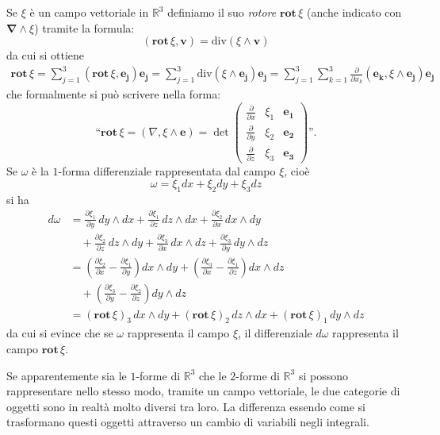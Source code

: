 \documentclass[italian,a4paper]{scrartcl}
\newcommand{\RR}{{\mathbb R}}
\newcommand{\defeq}{=}
\renewcommand{\vec}{\mathbf}
\renewcommand{\div}{\mathrm{div}}
\newcommand{\rot}{\mathbf{rot}\,}
\newcommand{\vecnabla}{\mathbf{\nabla}}
\begin{document}
Se $\xi$ è un campo vettoriale in $\RR^3$ definiamo
il suo \emph{rotore} $\rot \xi$ (anche indicato con $\vecnabla \wedge
\xi$)
tramite la formula:
\[
  (\rot \xi, \vec v) \defeq \div (\xi \wedge \vec v)
\]
da cui si ottiene
\begin{align*}
  \rot \xi = \sum_{j=1}^3 (\rot \xi,\vec{e_j})\vec{e_j}
 = \sum_{j=1}^3 \div(\xi \wedge \vec{e_j}) \vec{e_j}
 = \sum_{j=1}^3 \sum_{k=1}^3 \frac{\partial}{\partial x_k}(\vec {e_k},\xi\wedge
 \vec {e_j}) \vec{e_j}
\end{align*}
che formalmente si può scrivere nella forma:
\[
\text{``}\rot \xi = (\nabla,\xi \wedge \vec e)
= \det \begin{pmatrix} 
\frac{\partial}{\partial x} & \xi_1 & \vec{e_1}\\
\frac{\partial}{\partial y} & \xi_2 & \vec{e_2}\\
\frac{\partial}{\partial z} & \xi_3 & \vec{e_3}
\end{pmatrix}
\text{''}.
\]
Se $\omega$ è la $1$-forma differenziale rappresentata dal
campo $\xi$, cioè
\[
 \omega = \xi_1 dx + \xi_2 dy + \xi_3 dz
\]
si ha
\begin{align*}
d \omega
&= \frac{\partial \xi_1}{\partial y}\, dy\wedge dx
+ \frac{\partial \xi_1}{\partial z}\, dz\wedge dx
+ \frac{\partial \xi_2}{\partial x}\, dx\wedge dy
\\
& \quad + \frac{\partial \xi_2}{\partial z}\, dz\wedge dy
+ \frac{\partial \xi_3}{\partial x}\, dx\wedge dz
+ \frac{\partial \xi_3}{\partial y}\, dy\wedge dz
\\
&= 
\left(\frac{\partial \xi_2}{\partial x}-\frac{\partial \xi_1}{\partial y}\right) dx\wedge dy
+ \left(\frac{\partial \xi_3}{\partial x} - \frac{\partial \xi_1}{\partial z}\right) dx\wedge dz\\
&\quad + \left(\frac{\partial \xi_3}{\partial y} - \frac{\partial
  \xi_2}{\partial z}\right)  dy\wedge dz\\
&=  (\rot \xi)_3\, dx\wedge dy
  + (\rot \xi)_2\, dz\wedge dx
  + (\rot \xi)_1\, dy\wedge dz
\end{align*}
da cui si evince che se $\omega$ rappresenta il campo $\xi$, il
differenziale $d\omega$ rappresenta il campo $\rot \xi$.

Se apparentemente sia le $1$-forme di $\RR^3$ che le $2$-forme di
$\RR^3$ si possono rappresentare nello stesso modo, tramite un campo
vettoriale, le due categorie di oggetti sono in realtà molto diversi
tra loro. La differenza essendo come si trasformano questi oggetti
attraverso un cambio di variabili negli integrali.
\end{document}
